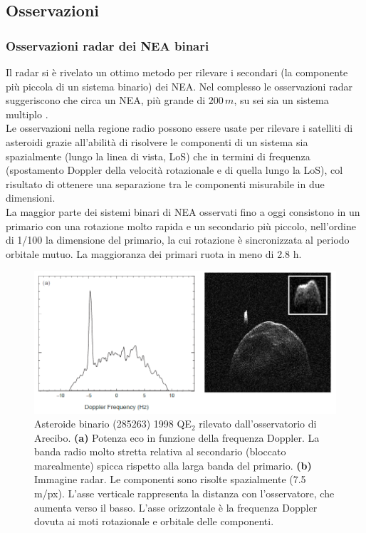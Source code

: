 \documentclass[a4paper,11pt,openright]{book}
\begin{document}
\subsection{Osservazioni}
\subsubsection{Osservazioni radar dei NEA binari}
Il radar si è rivelato un ottimo metodo per rilevare i secondari (la componente più piccola di un sistema binario) dei NEA. Nel complesso le osservazioni radar suggeriscono che circa un NEA, più grande di $200\,m$, su sei sia un sistema multiplo \citep{taylor_shape_2012}.\\
Le osservazioni nella regione radio possono essere usate per rilevare i satelliti di asteroidi grazie all'abilità di risolvere le componenti di un sistema sia spazialmente (lungo la linea di vista, LoS) che in termini di frequenza (spostamento Doppler della velocità rotazionale e di quella lungo la LoS), col risultato di ottenere una separazione tra le componenti misurabile in due dimensioni.\\
La maggior parte dei sistemi binari di NEA osservati fino a oggi consistono in un primario con una rotazione molto rapida e un secondario più piccolo, nell'ordine di 1/100 la dimensione del primario, la cui rotazione è sincronizzata al periodo orbitale mutuo. La maggioranza dei primari ruota in meno di 2.8 h.

\begin{figure}[!h]
    \centering
    \includegraphics[scale=0.4]{figure/radar_image.png}
    \caption[Asteroide binario (285263) 1998 QE$_2$ rilevato dall'osservatorio di Arecibo.]{Asteroide binario (285263) 1998 QE$_2$ rilevato dall'osservatorio di Arecibo. \textbf{(a)} Potenza eco in funzione della frequenza Doppler. La banda radio molto stretta relativa al secondario (bloccato marealmente) spicca rispetto alla larga banda del primario. \textbf{(b)} Immagine radar. Le componenti sono risolte spazialmente (7.5 m/px). L'asse verticale rappresenta la distanza con l'osservatore, che aumenta verso il basso. L'asse orizzontale è la frequenza Doppler dovuta ai moti rotazionale e orbitale delle componenti. \citep{michel_asteroid_2015-1}}
    \label{fig:radar_image}
\end{figure}
\end{document}
